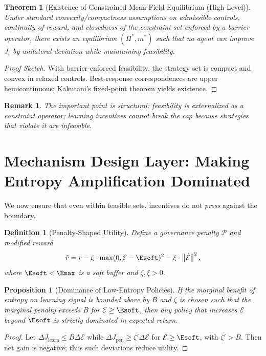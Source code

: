 \documentclass[11pt]{article}
\newtheorem{definition}{Definition}
\newtheorem{theorem}{Theorem}
\newtheorem{proposition}{Proposition}
\newtheorem{remark}{Remark}
\newcommand{\Eenv}{\mathcal{E}}     %
\newcommand{\norm}[1]{\left\lVert #1\right\rVert}
\begin{document}
\begin{theorem}[Existence of Constrained Mean-Field Equilibrium (High-Level)]
Under standard convexity/compactness assumptions on admissible controls, continuity of reward, and closedness of the constraint set enforced by a barrier operator, there exists an equilibrium $(\Pi^*,m^*)$ such that no agent can improve $J_i$ by unilateral deviation while maintaining feasibility.
\end{theorem}

\begin{proof}[Proof Sketch]
With barrier-enforced feasibility, the strategy set is compact and convex in relaxed controls. Best-response correspondences are upper hemicontinuous; Kakutani’s fixed-point theorem yields existence.
\end{proof}

\begin{remark}
The important point is structural: feasibility is externalized as a constraint operator; learning incentives cannot break the cap because strategies that violate it are infeasible.
\end{remark}

\section{Mechanism Design Layer: Making Entropy Amplification Dominated}

We now ensure that even within feasible sets, incentives do not \emph{press} against the boundary.

\begin{definition}[Penalty-Shaped Utility]
Define a governance penalty $\mathcal{P}$ and modified reward
\[
\tilde r = r - \zeta \cdot \max(0,\Eenv-\Esoft)^2 - \xi\cdot \norm{\dot{\Eenv}}^2,
\]
where $\Esoft<\Emax$ is a soft buffer and $\zeta,\xi>0$.
\end{definition}

\begin{proposition}[Dominance of Low-Entropy Policies]
If the marginal benefit of entropy on learning signal is bounded above by $B$ and $\zeta$ is chosen such that the marginal penalty exceeds $B$ for $\Eenv\ge \Esoft$, then any policy that increases $\Eenv$ beyond $\Esoft$ is strictly dominated in expected return.
\end{proposition}

\begin{proof}
Let $\Delta J_{\text{learn}}\le B\Delta \Eenv$ while $\Delta J_{\text{pen}}\ge \zeta' \Delta \Eenv$ for $\Eenv\ge \Esoft$, with $\zeta'>B$. Then net gain is negative; thus such deviations reduce utility.
\end{proof}
\end{document}
